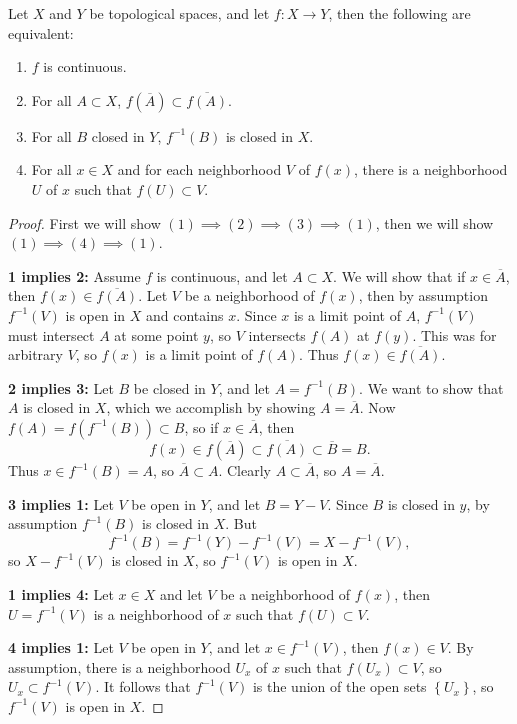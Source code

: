 \documentclass[10pt]{report}
\begin{document}
\begin{thrm}{}{}
Let $X$ and $Y$ be topological spaces, and let $f: X \to Y$, then the following are equivalent:
\begin{enumerate}
	\item $f$ is continuous.
	\item For all $A \subset X$, $f(\overline{A}) \subset \overline{f(A)} $.
	\item For all $B$ closed in $Y$, $f^{-1}(B)$ is closed in $X$.
	\item For all $x \in X$ and for each neighborhood $V$ of $f(x)$, there is a neighborhood $U$ of $x$ such that $f(U) \subset V$.
\end{enumerate}
\end{thrm}
\begin{proof}
	First we will show $(1) \implies (2) \implies (3) \implies (1)$, then we will show $(1) \implies (4) \implies (1)$.

	\textbf{1 implies 2:} Assume $f$ is continuous, and let $A \subset X$. We will show that if $x \in \overline{A}$, then $f(x) \in \overline{f(A)} $. Let $V$ be a neighborhood of $f(x)$, then by assumption $f^{-1}(V)$ is open in $X$ and contains $x$. Since $x$ is a limit point of $A$, $f^{-1}(V)$ must intersect $A$ at some point $y$, so $V$ intersects $f(A)$ at $f(y)$. This was for arbitrary $V$, so $f(x)$ is a limit point of $f(A)$. Thus $f(x) \in \overline{f(A)} $.

	\textbf{2 implies 3:} Let $B$ be closed in $Y$, and let $A = f^{-1}(B)$. We want to show that $A$ is closed in $X$, which we accomplish by showing $A = \overline{A}$. Now $f(A) = f(f^{-1}(B)) \subset B$, so if $x \in \overline{A}$, then
	\[
		f(x) \in f(\overline{A}) \subset \overline{f(A)} \subset \overline{B} = B.
	\] 
	Thus $x \in f^{-1}(B) = A$, so $\overline{A} \subset A$. Clearly $A \subset \overline{A}$, so $A = \overline{A}$.

	\textbf{3 implies 1:} Let $V$ be open in $Y$, and let $B = Y-V$. Since $B$ is closed in $y$, by assumption $f^{-1}(B)$ is closed in $X$. But
	\[
		f^{-1}(B) = f^{-1}(Y) - f^{-1}(V) = X - f^{-1}(V),
	\] so $X - f^{-1}(V)$ is closed in $X$, so $f^{-1}(V)$ is open in $X$.

	\textbf{1 implies 4:} Let $x \in X$ and let $V$ be a neighborhood of $f(x)$, then $U=f^{-1}(V)$ is a neighborhood of $x$ such that $f(U) \subset V$.

	\textbf{4 implies 1:} Let $V$ be open in $ Y$, and let $x \in f^{-1}(V)$, then $f(x) \in V$. By assumption, there is a neighborhood $U_x$ of $x$ such that $f(U_x)\subset V$, so $U_x \subset f^{-1}(V)$. It follows that $f^{-1}(V)$ is the union of the open sets $\left\{ U_x \right\}$, so $f^{-1}(V)$ is open in $X$.
\end{proof}
\end{document}
